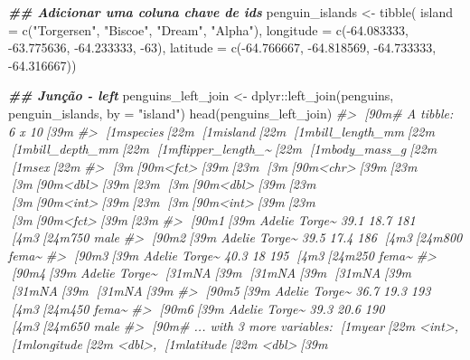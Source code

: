 \documentclass[
]{book}
\newenvironment{Shaded}{\begin{snugshade}}{\end{snugshade}}
\newcommand{\AttributeTok}[1]{\textcolor[rgb]{0.61,0.61,0.61}{#1}}
\newcommand{\CommentTok}[1]{\textcolor[rgb]{0.37,0.37,0.37}{\textit{#1}}}
\newcommand{\DecValTok}[1]{\textcolor[rgb]{0.06,0.06,0.06}{#1}}
\newcommand{\DocumentationTok}[1]{\textcolor[rgb]{0.37,0.37,0.37}{\textbf{\textit{#1}}}}
\newcommand{\FloatTok}[1]{\textcolor[rgb]{0.06,0.06,0.06}{#1}}
\newcommand{\FunctionTok}[1]{\textcolor[rgb]{0,0,0}{#1}}
\newcommand{\NormalTok}[1]{#1}
\newcommand{\OtherTok}[1]{\textcolor[rgb]{0.37,0.37,0.37}{#1}}
\newcommand{\SpecialCharTok}[1]{\textcolor[rgb]{0,0,0}{#1}}
\newcommand{\StringTok}[1]{\textcolor[rgb]{0.5,0.5,0.5}{#1}}
\begin{document}
\begin{Shaded}
\begin{Highlighting}[]
\DocumentationTok{\#\# Adicionar uma coluna chave de ids}
\NormalTok{penguin\_islands }\OtherTok{\textless{}{-}} \FunctionTok{tibble}\NormalTok{(}
  \AttributeTok{island =} \FunctionTok{c}\NormalTok{(}\StringTok{"Torgersen"}\NormalTok{, }\StringTok{"Biscoe"}\NormalTok{, }\StringTok{"Dream"}\NormalTok{, }\StringTok{"Alpha"}\NormalTok{),}
  \AttributeTok{longitude =} \FunctionTok{c}\NormalTok{(}\SpecialCharTok{{-}}\FloatTok{64.083333}\NormalTok{, }\SpecialCharTok{{-}}\FloatTok{63.775636}\NormalTok{, }\SpecialCharTok{{-}}\FloatTok{64.233333}\NormalTok{, }\SpecialCharTok{{-}}\DecValTok{63}\NormalTok{),}
  \AttributeTok{latitude =} \FunctionTok{c}\NormalTok{(}\SpecialCharTok{{-}}\FloatTok{64.766667}\NormalTok{, }\SpecialCharTok{{-}}\FloatTok{64.818569}\NormalTok{, }\SpecialCharTok{{-}}\FloatTok{64.733333}\NormalTok{, }\SpecialCharTok{{-}}\FloatTok{64.316667}\NormalTok{))}
  
\DocumentationTok{\#\# Junção {-} left}
\NormalTok{penguins\_left\_join }\OtherTok{\textless{}{-}}\NormalTok{ dplyr}\SpecialCharTok{::}\FunctionTok{left\_join}\NormalTok{(penguins, penguin\_islands, }\AttributeTok{by =} \StringTok{"island"}\NormalTok{)}
\FunctionTok{head}\NormalTok{(penguins\_left\_join)}
\CommentTok{\#\textgreater{} [90m\# A tibble: 6 x 10[39m}
\CommentTok{\#\textgreater{}   [1mspecies[22m [1misland[22m [1mbill\_length\_mm[22m [1mbill\_depth\_mm[22m [1mflipper\_length\_\textasciitilde{}[22m [1mbody\_mass\_g[22m [1msex[22m  }
\CommentTok{\#\textgreater{}   [3m[90m\textless{}fct\textgreater{}[39m[23m   [3m[90m\textless{}chr\textgreater{}[39m[23m           [3m[90m\textless{}dbl\textgreater{}[39m[23m         [3m[90m\textless{}dbl\textgreater{}[39m[23m            [3m[90m\textless{}int\textgreater{}[39m[23m       [3m[90m\textless{}int\textgreater{}[39m[23m [3m[90m\textless{}fct\textgreater{}[39m[23m}
\CommentTok{\#\textgreater{} [90m1[39m Adelie  Torge\textasciitilde{}           39.1          18.7              181        [4m3[24m750 male }
\CommentTok{\#\textgreater{} [90m2[39m Adelie  Torge\textasciitilde{}           39.5          17.4              186        [4m3[24m800 fema\textasciitilde{}}
\CommentTok{\#\textgreater{} [90m3[39m Adelie  Torge\textasciitilde{}           40.3          18                195        [4m3[24m250 fema\textasciitilde{}}
\CommentTok{\#\textgreater{} [90m4[39m Adelie  Torge\textasciitilde{}           [31mNA[39m            [31mNA[39m                 [31mNA[39m          [31mNA[39m [31mNA[39m   }
\CommentTok{\#\textgreater{} [90m5[39m Adelie  Torge\textasciitilde{}           36.7          19.3              193        [4m3[24m450 fema\textasciitilde{}}
\CommentTok{\#\textgreater{} [90m6[39m Adelie  Torge\textasciitilde{}           39.3          20.6              190        [4m3[24m650 male }
\CommentTok{\#\textgreater{} [90m\# ... with 3 more variables: [1myear[22m \textless{}int\textgreater{}, [1mlongitude[22m \textless{}dbl\textgreater{}, [1mlatitude[22m \textless{}dbl\textgreater{}[39m}
\end{Highlighting}
\end{Shaded}
\end{document}
